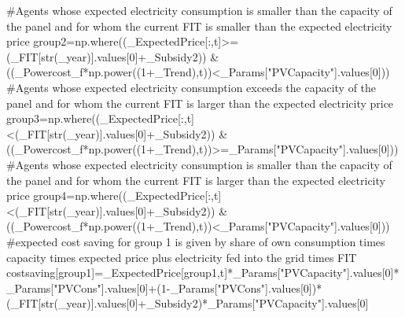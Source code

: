 \documentclass[
  letterpaper,
  DIV=11,
  numbers=noendperiod]{scrartcl}
\newenvironment{Shaded}{\begin{snugshade}}{\end{snugshade}}
\newcommand{\BuiltInTok}[1]{\textcolor[rgb]{0.00,0.23,0.31}{#1}}
\newcommand{\CommentTok}[1]{\textcolor[rgb]{0.37,0.37,0.37}{#1}}
\newcommand{\DecValTok}[1]{\textcolor[rgb]{0.68,0.00,0.00}{#1}}
\newcommand{\NormalTok}[1]{\textcolor[rgb]{0.00,0.23,0.31}{#1}}
\newcommand{\OperatorTok}[1]{\textcolor[rgb]{0.37,0.37,0.37}{#1}}
\newcommand{\StringTok}[1]{\textcolor[rgb]{0.13,0.47,0.30}{#1}}
\begin{document}
\begin{Shaded}
\begin{Highlighting}[]
        \CommentTok{\#Agents whose expected electricity consumption is smaller than the capacity of the panel and for whom the current FIT is smaller than the expected electricity price}
\NormalTok{        group2}\OperatorTok{=}\NormalTok{np.where((\_ExpectedPrice[:,t]}\OperatorTok{\textgreater{}=}\NormalTok{(\_FIT[}\BuiltInTok{str}\NormalTok{(\_year)].values[}\DecValTok{0}\NormalTok{]}\OperatorTok{+}\NormalTok{\_Subsidy2)) }\OperatorTok{\&}\NormalTok{ ((\_Powercost\_f}\OperatorTok{*}\NormalTok{np.power((}\DecValTok{1}\OperatorTok{+}\NormalTok{\_Trend),t))}\OperatorTok{\textless{}}\NormalTok{\_Params[}\StringTok{"PVCapacity"}\NormalTok{].values[}\DecValTok{0}\NormalTok{]))}
        \CommentTok{\#Agents whose expected electricity consumption exceeds the capacity of the panel and for whom the current FIT is larger than the expected electricity price}
\NormalTok{        group3}\OperatorTok{=}\NormalTok{np.where((\_ExpectedPrice[:,t]}\OperatorTok{\textless{}}\NormalTok{(\_FIT[}\BuiltInTok{str}\NormalTok{(\_year)].values[}\DecValTok{0}\NormalTok{]}\OperatorTok{+}\NormalTok{\_Subsidy2)) }\OperatorTok{\&}\NormalTok{ ((\_Powercost\_f}\OperatorTok{*}\NormalTok{np.power((}\DecValTok{1}\OperatorTok{+}\NormalTok{\_Trend),t))}\OperatorTok{\textgreater{}=}\NormalTok{\_Params[}\StringTok{"PVCapacity"}\NormalTok{].values[}\DecValTok{0}\NormalTok{]))}
        \CommentTok{\#Agents whose expected electricity consumption is smaller than the capacity of the panel and for whom the current FIT is larger than the expected electricity price}
\NormalTok{        group4}\OperatorTok{=}\NormalTok{np.where((\_ExpectedPrice[:,t]}\OperatorTok{\textless{}}\NormalTok{(\_FIT[}\BuiltInTok{str}\NormalTok{(\_year)].values[}\DecValTok{0}\NormalTok{]}\OperatorTok{+}\NormalTok{\_Subsidy2)) }\OperatorTok{\&}\NormalTok{ ((\_Powercost\_f}\OperatorTok{*}\NormalTok{np.power((}\DecValTok{1}\OperatorTok{+}\NormalTok{\_Trend),t))}\OperatorTok{\textless{}}\NormalTok{\_Params[}\StringTok{"PVCapacity"}\NormalTok{].values[}\DecValTok{0}\NormalTok{]))}
        \CommentTok{\#expected cost saving for group 1 is given by share of own consumption times capacity times expected price plus electricity fed into the grid times FIT}
\NormalTok{        costsaving[group1]}\OperatorTok{=}\NormalTok{\_ExpectedPrice[group1,t]}\OperatorTok{*}\NormalTok{\_Params[}\StringTok{"PVCapacity"}\NormalTok{].values[}\DecValTok{0}\NormalTok{]}\OperatorTok{*}\NormalTok{\_Params[}\StringTok{"PVCons"}\NormalTok{].values[}\DecValTok{0}\NormalTok{]}\OperatorTok{+}\NormalTok{(}\DecValTok{1}\OperatorTok{{-}}\NormalTok{\_Params[}\StringTok{"PVCons"}\NormalTok{].values[}\DecValTok{0}\NormalTok{])}\OperatorTok{*}\NormalTok{(\_FIT[}\BuiltInTok{str}\NormalTok{(\_year)].values[}\DecValTok{0}\NormalTok{]}\OperatorTok{+}\NormalTok{\_Subsidy2)}\OperatorTok{*}\NormalTok{\_Params[}\StringTok{"PVCapacity"}\NormalTok{].values[}\DecValTok{0}\NormalTok{]}

\end{Highlighting}
\end{Shaded}
\end{document}
